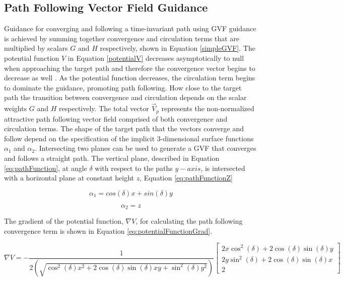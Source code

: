 \documentclass[numbered,pdftex]{ohio-etd}
\begin{document}
\subsection{Path Following Vector Field Guidance}
Guidance for converging and following a time-invariant path using GVF guidance is achieved by summing together convergence and circulation terms that are multiplied by scalars $G$ and $H$ respectively, shown in Equation \ref{simpleGVF}. The potential function $V$ in Equation \ref{potentialV} decreases asymptotically to null when approaching the target path and therefore the convergence vector begins to decrease as well \cite{goncalves_artificial_2009}. As the potential function decreases, the circulation term begins to dominate the guidance, promoting path following. How close to the target path the transition between convergence and circulation depends on the scalar weights $G$ and $H$ respectively. The total vector $\overrightarrow{V}_p$ represents the non-normalized attractive path following vector field comprised of both convergence and circulation terms. The shape of the target path that the vectors converge and follow depend on the specification of the implicit 3-dimensional surface functions $\alpha_1$ and $\alpha_2$. Intersecting two planes can be used to generate a GVF that converges and follows a straight path. The vertical plane, described in Equation \ref{eq:pathFunction}, at angle $\delta$ with respect to the paths $y-axis$, is intersected with a horizontal plane at constant height $z$, Equation \ref{eq:pathFunctionZ}



\begin{equation}
\label{eq:pathFunction}
\alpha_1 = cos(\delta)x + sin(\delta)y
\end{equation}

\begin{equation}
\label{eq:pathFunctionZ}
\alpha_2 = z
\end{equation}



\noindent
The gradient of the potential function, $\nabla V$, for calculating the path following convergence term is shown in Equation \ref{eq:potentialFunctionGrad}.

\begin{equation}
\label{eq:potentialFunctionGrad}
\nabla V = -\frac{1}{2(\sqrt{\cos^2(\delta) x^2+2\cos(\delta)\sin(\delta) xy +\sin^2 (\delta) y^2})} \begin{bmatrix}
2x\cos^2(\delta) + 2\cos(\delta)\sin(\delta) y \\
2y\sin^2(\delta) + 2\cos(\delta)\sin(\delta) x \\
2
\end{bmatrix}
\end{equation}
\end{document}
